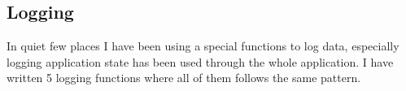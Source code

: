 \subsection{Logging}
In quiet few places I have been using a special functions to log data, especially logging application state has been used through the whole application.
I have written 5 logging functions where all of them follows the same pattern.
\begin{figure}[h]
    \centering
    \renewcommand{\thesubfigure}{}%
    \tightsubcaptions %
    \setlength{\subfloatlabelskip}{0pt}%
\end{figure}
\begin{figure}[h]\ContinuedFloat
    \centering
    \renewcommand{\thesubfigure}{}%
    \tightsubcaptions %
    \setlength{\subfloatlabelskip}{0pt}%
\end{figure}
